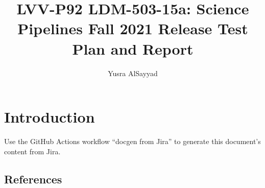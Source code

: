 \documentclass[DM,lsstdraft,toc]{lsstdoc}
\begin{document}
\def\milestoneName{LDM-503-15a: Science Pipelines Fall 2021 Release}
\def\milestoneId{LVV-P92}
\def\product{Data Management}


\title{LVV-P92 LDM-503-15a: Science Pipelines Fall 2021 Release Test Plan and Report}
\setDocRef{\lsstDocType-\lsstDocNum}
\date{\vcsDate}
\author{Yusra AlSayyad}




\maketitle

\section{Introduction}
Use the GitHub Actions workflow ``docgen from Jira'' to generate this document's content from Jira.

\subsection{References}
\label{sect:references}
\renewcommand{\refname}{}




\end{document}
